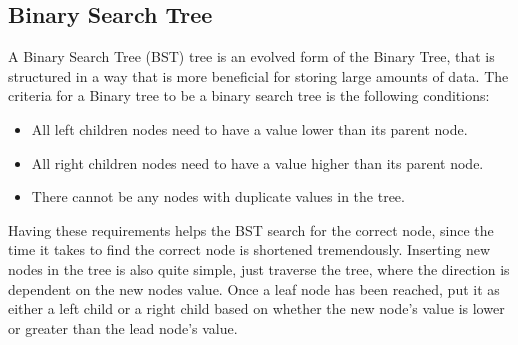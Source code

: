 \subsection{Binary Search Tree}
A Binary Search Tree (BST) tree is an evolved form of the Binary Tree, that is structured in a way that is more beneficial for storing large amounts of data. The criteria for a Binary tree to be a binary search tree is the following conditions:
\begin{itemize}
    \item{All left children nodes need to have a value lower than its parent node.}
    \item{All right children nodes need to have a value higher than its parent node.}
    \item{There cannot be any nodes with duplicate values in the tree.}
\end{itemize}
Having these requirements helps the BST search for the correct node, since the time it takes to find the correct node is shortened tremendously. Inserting new nodes in the tree is also quite simple, just traverse the tree, where the direction is dependent on the new nodes value. Once a leaf node has been reached, put it as either a left child or a right child based on whether the new node's value is lower or greater than the lead node's value.